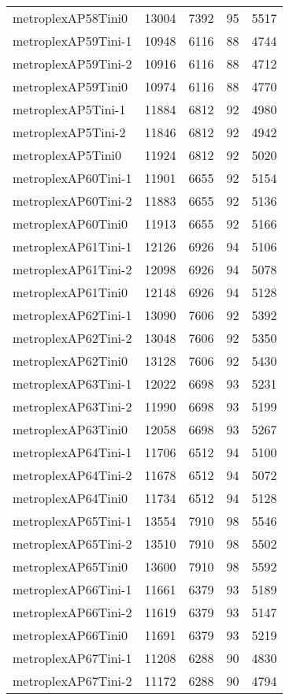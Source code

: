 \begin{longtable}{lrrrr}
metroplexAP58Tini0 & 13004 & 7392 & 95 & 5517 \\
metroplexAP59Tini-1 & 10948 & 6116 & 88 & 4744 \\
metroplexAP59Tini-2 & 10916 & 6116 & 88 & 4712 \\
metroplexAP59Tini0 & 10974 & 6116 & 88 & 4770 \\
metroplexAP5Tini-1 & 11884 & 6812 & 92 & 4980 \\
metroplexAP5Tini-2 & 11846 & 6812 & 92 & 4942 \\
metroplexAP5Tini0 & 11924 & 6812 & 92 & 5020 \\
metroplexAP60Tini-1 & 11901 & 6655 & 92 & 5154 \\
metroplexAP60Tini-2 & 11883 & 6655 & 92 & 5136 \\
metroplexAP60Tini0 & 11913 & 6655 & 92 & 5166 \\
metroplexAP61Tini-1 & 12126 & 6926 & 94 & 5106 \\
metroplexAP61Tini-2 & 12098 & 6926 & 94 & 5078 \\
metroplexAP61Tini0 & 12148 & 6926 & 94 & 5128 \\
metroplexAP62Tini-1 & 13090 & 7606 & 92 & 5392 \\
metroplexAP62Tini-2 & 13048 & 7606 & 92 & 5350 \\
metroplexAP62Tini0 & 13128 & 7606 & 92 & 5430 \\
metroplexAP63Tini-1 & 12022 & 6698 & 93 & 5231 \\
metroplexAP63Tini-2 & 11990 & 6698 & 93 & 5199 \\
metroplexAP63Tini0 & 12058 & 6698 & 93 & 5267 \\
metroplexAP64Tini-1 & 11706 & 6512 & 94 & 5100 \\
metroplexAP64Tini-2 & 11678 & 6512 & 94 & 5072 \\
metroplexAP64Tini0 & 11734 & 6512 & 94 & 5128 \\
metroplexAP65Tini-1 & 13554 & 7910 & 98 & 5546 \\
metroplexAP65Tini-2 & 13510 & 7910 & 98 & 5502 \\
metroplexAP65Tini0 & 13600 & 7910 & 98 & 5592 \\
metroplexAP66Tini-1 & 11661 & 6379 & 93 & 5189 \\
metroplexAP66Tini-2 & 11619 & 6379 & 93 & 5147 \\
metroplexAP66Tini0 & 11691 & 6379 & 93 & 5219 \\
metroplexAP67Tini-1 & 11208 & 6288 & 90 & 4830 \\
metroplexAP67Tini-2 & 11172 & 6288 & 90 & 4794 \\

\end{longtable}
